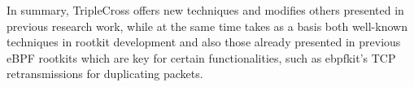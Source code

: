 In summary, TripleCross offers new techniques and modifies others presented in previous research work, while at the same time takes as a basis both well-known techniques in rootkit development and also those already presented in previous eBPF rootkits which are key for certain functionalities, such as ebpfkit's TCP retransmissions for duplicating packets.

